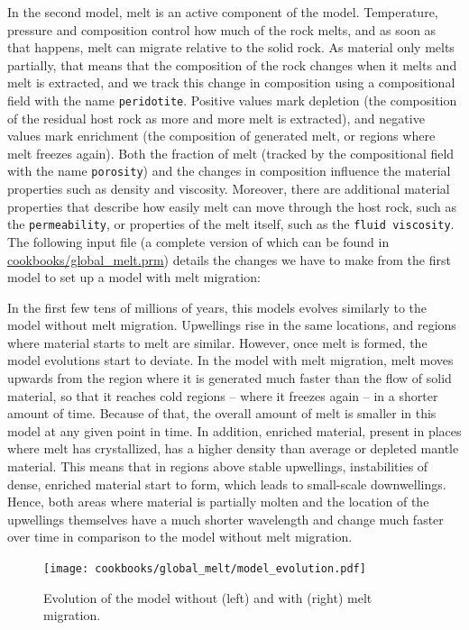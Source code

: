 \documentclass{article}
\begin{document}
In the second model, melt is an active component of the model. Temperature, pressure and composition control how much of the rock melts, and as soon as that happens, melt can migrate relative to the solid rock. As material only melts partially, that means that the composition of the rock changes when it melts and melt is extracted, and we track this change in composition using a compositional field with the name \texttt{peridotite}. Positive values mark depletion (the composition of the residual host rock as more and more melt is extracted), and negative values mark enrichment (the composition of generated melt, or regions where melt freezes again). Both the fraction of melt (tracked by the compositional field with the name \texttt{porosity}) and the changes in composition influence the material properties such as density and viscosity. Moreover, there are additional material properties that describe how easily melt can move through the host rock, such as the \texttt{permeability}, or properties of the melt itself, such as the \texttt{fluid viscosity}. 
The following input file (a complete version of which can be found in \url{cookbooks/global_melt.prm}) details the changes we have to make from the first model to set up a model with melt migration:



In the first few tens of millions of years, this models evolves similarly to the model without melt migration. Upwellings rise in the same locations, and regions where material starts to melt are similar. However, once melt is formed, the model evolutions start to deviate. In the model with melt migration, melt moves upwards from the region where it is generated much faster than the flow of solid material, so that it reaches cold regions -- where it freezes again -- in a shorter amount of time. Because of that, the overall amount of melt is smaller in this model at any given point in time. In addition, enriched material, present in places where melt has crystallized, has a higher density than average or depleted mantle material. This means that in regions above stable upwellings, instabilities of dense, enriched material start to form, which leads to small-scale downwellings. Hence, both areas where material is partially molten and the location of the upwellings themselves have a much shorter wavelength and change much faster over time in comparison to the model without melt migration.

\begin{figure}
    \centering
    \texttt{[image: cookbooks/global\_melt/model\_evolution.pdf]}
    \caption{Evolution of the model without (left) and with (right) melt migration.}
    \label{fig:global-melt}
\end{figure}
\end{document}
